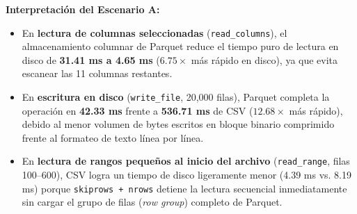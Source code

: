 \documentclass[11pt,a4paper]{article}
\begin{document}
\begin{table}[H]
\centering
\caption{Escenario A — Comparación de formatos CSV vs. Parquet según patrón de acceso y tamaño.}
\label{tab:scenario_a}
\end{table}

\textbf{Interpretación del Escenario A:}
\begin{itemize}
    \item En \textbf{lectura de columnas seleccionadas} (\texttt{read\_columns}), el almacenamiento columnar de Parquet reduce el tiempo puro de lectura en disco de \textbf{31.41 ms a 4.65 ms} ($6.75\times$ más rápido en disco), ya que evita escanear las 11 columnas restantes.
    \item En \textbf{escritura en disco} (\texttt{write\_file}, 20,000 filas), Parquet completa la operación en \textbf{42.33 ms} frente a \textbf{536.71 ms} de CSV ($12.68\times$ más rápido), debido al menor volumen de bytes escritos en bloque binario comprimido frente al formateo de texto línea por línea.
    \item En \textbf{lectura de rangos pequeños al inicio del archivo} (\texttt{read\_range}, filas 100--600), CSV logra un tiempo de disco ligeramente menor (4.39 ms vs. 8.19 ms) porque \texttt{skiprows + nrows} detiene la lectura secuencial inmediatamente sin cargar el grupo de filas (\textit{row group}) completo de Parquet.
\end{itemize}
\end{document}
